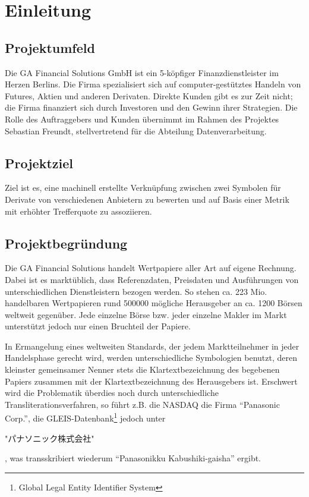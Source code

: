 \section{Einleitung}
\subsection{Projektumfeld}
Die GA Financial Solutions GmbH ist ein 5-köpfiger Finanzdienstleister im
Herzen Berlins. Die Firma spezialisiert sich auf computer-gestütztes Handeln
von Futures, Aktien und anderen Derivaten. Direkte Kunden gibt es zur Zeit
nicht; die Firma finanziert sich durch Investoren und den Gewinn ihrer
Strategien. Die Rolle des Auftraggebers und Kunden übernimmt im Rahmen des
Projektes Sebastian Freundt, stellvertretend für die Abteilung Datenverarbeitung.\par

\subsection{Projektziel}
Ziel ist es, eine machinell erstellte Verknüpfung zwischen zwei Symbolen für
Derivate von verschiedenen Anbietern zu bewerten und auf Basis einer Metrik
mit erhöhter Trefferquote zu assoziieren. \par

\subsection{Projektbegründung}
Die GA Financial Solutions handelt Wertpapiere aller Art auf eigene
Rechnung.  Dabei ist es marktüblich, dass Referenzdaten, Preisdaten
und Ausführungen von unterschiedlichen Dienstleistern bezogen werden.
So stehen ca. 223 Mio. handelbaren Wertpapieren rund 500000 mögliche
Herausgeber an ca. 1200 Börsen weltweit gegenüber.  Jede einzelne
Börse bzw. jeder einzelne Makler im Markt unterstützt jedoch nur
einen Bruchteil der Papiere.\par

In Ermangelung eines weltweiten Standards, der jedem Marktteilnehmer in
jeder Handelsphase gerecht wird, werden unterschiedliche Symbologien
benutzt, deren kleinster gemeinsamer Nenner stets die
Klartextbezeichnung des begebenen Papiers zusammen mit der
Klartextbezeichnung des Herausgebers ist.  Erschwert wird die
Problematik überdies noch durch unterschiedliche Transliterationsverfahren,
so führt z.B. die NASDAQ die Firma "`Panasonic Corp."',
die GLEIS-Datenbank\footnote{Global Legal Entity Identifier System} jedoch unter
\begin{CJK}{UTF8}{min}
"パナソニック株式会社"
\end{CJK}%
, was transskribiert wiederum "`Panasonikku Kabushiki-gaisha"' ergibt. \par

